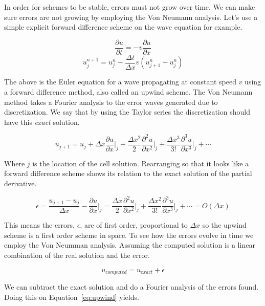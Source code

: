 \documentclass[12pt,upcase]{umlthesis}
\begin{document}
In order for schemes to be stable, errors must not grow over time. We can make sure errors are not growing by employing the Von Neumann analysis. Let's use a simple explicit forward difference scheme on the wave equation for example.

\begin{equation}
	\frac{\partial u}{\partial t} = -v\frac{\partial u}{\partial x}
\end{equation}
\begin{equation}\label{eq:upwind}
	u^{n+1}_j = u^n_j - \frac{\Delta t}{\Delta x}v(u^n_{j+1}-u^n_{j})
\end{equation}

The above is the Euler equation for a wave propagating at constant speed $v$ using a forward difference method, also called an upwind scheme. The Von Neumann method takes a Fourier analysis to the error waves generated due to discretization. We say that by using the Taylor series the discretization should have this {\it exact\/} solution.

\begin{equation}
	u_{j+1} = u_j + \Delta x {\frac{\partial u}{\partial x}}\rvert_j + \frac{\Delta x^2}{2} {\frac{\partial^2 u}{\partial x^2}}\rvert_j + \frac{\Delta x^3}{3!} {\frac{\partial^3 u}{\partial x^3}}\rvert_j + \cdots 
\end{equation}

Where $j$ is the location of the cell solution. Rearranging so that it looks like a forward difference scheme shows its relation to the exact solution of the partial derivative.

\begin{equation}
	\epsilon = \frac{u_{j+1} - u_j}{\Delta x} - {\frac{\partial u}{\partial x}}\rvert_j =  \frac{\Delta x}{2} {\frac{\partial^2 u}{\partial x^2}}\rvert_j + \frac{\Delta x^2}{3!} {\frac{\partial^3 u}{\partial x^3}}\rvert_j + \cdots = O(\Delta x)
\end{equation}

This means the errors, $\epsilon$, are of first order, proportional to $\Delta x$ so the upwind scheme is a first order scheme in space. To see how the errors evolve in time we employ the Von Neumman analysis. Assuming the computed solution is a linear combination of the real solution and the error.

\begin{equation}
	u_{computed} = u_{exact} + \epsilon
\end{equation}

We can subtract the exact solution and do a Fourier analysis of the errors found. Doing this on Equation~\ref{eq:upwind} yields.
\end{document}

